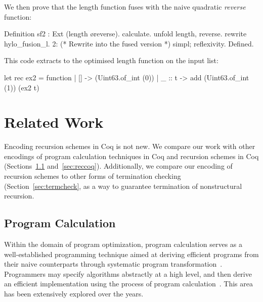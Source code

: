 \documentclass{llncs}
\begin{document}
We then prove that the length function fuses with
the naive quadratic \emph{reverse} function:
\begin{coqcode}
Definition sf2 : Ext (length \o reverse).
  calculate.  unfold length, reverse. rewrite hylo_fusion_l.
  2:{ (* Rewrite into the fused version *) }
  simpl; reflexivity.
Defined.
\end{coqcode}
This code extracts to the optimised length function on the input list:
\begin{ocamlcode}
let rec ex2 = function | [] -> (Uint63.of_int (0))
                       | _ :: t -> add (Uint63.of_int (1)) (ex2 t)
\end{ocamlcode}

\section{Related Work}
\label{sec:related-work}
%
Encoding recursion schemes in Coq is not new. We compare our work with other
encodings of program calculation techniques in Coq and recursion schemes in Coq
(Sections~\ref{sec:calccoq} and~\ref{sec:reccoq}). Additionally, we compare our
encoding of recursion schemes to other forms of termination checking
(Section~\ref{sec:termcheck}, as a way to guarantee termination of nonstructural
recursion.

\subsection{Program Calculation}\label{sec:calccoq}

Within the domain of program optimization, program calculation serves as a
well-established programming technique aimed at deriving efficient programs from
their naive counterparts through systematic program
transformation~\cite{gibbonsSquiggol}. Programmers may specify algorithms
abstractly at a high level, and then derive an efficient implementation using
the process of program calculation~\cite{BirddeMoor96:Algebra}. This area has
been extensively explored over the years.
\end{document}
